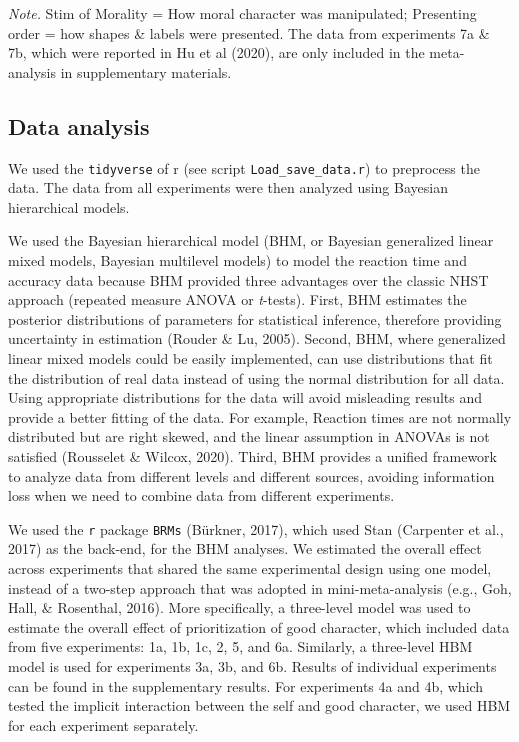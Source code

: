 \documentclass[
  man]{apa6}
\begin{document}
\begin{table}[tbp]
\begin{center}
\begin{threeparttable}
\begin{tablenotes}[para]
\normalsize{\textit{Note.} Stim of Morality = How moral character was manipulated; Presenting order = how shapes \& labels were presented. The data from experiments 7a \& 7b, which were reported in Hu et al (2020), are only included in the meta-analysis in supplementary materials.}
\end{tablenotes}

\end{threeparttable}
\end{center}

\end{table}

\hypertarget{data-analysis}{%
\subsection{Data analysis}\label{data-analysis}}

We used the \texttt{tidyverse} of r (see script \texttt{Load\_save\_data.r}) to preprocess the data. The data from all experiments were then analyzed using Bayesian hierarchical models.

We used the Bayesian hierarchical model (BHM, or Bayesian generalized linear mixed models, Bayesian multilevel models) to model the reaction time and accuracy data because BHM provided three advantages over the classic NHST approach (repeated measure ANOVA or \emph{t}-tests). First, BHM estimates the posterior distributions of parameters for statistical inference, therefore providing uncertainty in estimation (Rouder \& Lu, 2005). Second, BHM, where generalized linear mixed models could be easily implemented, can use distributions that fit the distribution of real data instead of using the normal distribution for all data. Using appropriate distributions for the data will avoid misleading results and provide a better fitting of the data. For example, Reaction times are not normally distributed but are right skewed, and the linear assumption in ANOVAs is not satisfied (Rousselet \& Wilcox, 2020). Third, BHM provides a unified framework to analyze data from different levels and different sources, avoiding information loss when we need to combine data from different experiments.

We used the \texttt{r} package \texttt{BRMs} (Bürkner, 2017), which used Stan (Carpenter et al., 2017) as the back-end, for the BHM analyses. We estimated the overall effect across experiments that shared the same experimental design using one model, instead of a two-step approach that was adopted in mini-meta-analysis (e.g., Goh, Hall, \& Rosenthal, 2016). More specifically, a three-level model was used to estimate the overall effect of prioritization of good character, which included data from five experiments: 1a, 1b, 1c, 2, 5, and 6a. Similarly, a three-level HBM model is used for experiments 3a, 3b, and 6b. Results of individual experiments can be found in the supplementary results. For experiments 4a and 4b, which tested the implicit interaction between the self and good character, we used HBM for each experiment separately.
\end{document}
